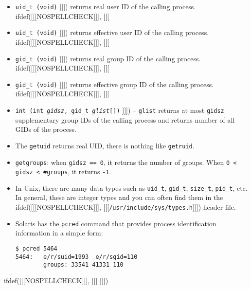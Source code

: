 \begin{slide}
\begin{itemize}
ifdef([[[NOSPELLCHECK]]], [[[
\item \texttt{uid\_t (void)}
]]])
returns real user ID of the calling process.
ifdef([[[NOSPELLCHECK]]], [[[
\item \texttt{uid\_t (void)}
]]])
returns effective user ID of the calling process.
ifdef([[[NOSPELLCHECK]]], [[[
\item \texttt{gid\_t (void)}
]]])
returns real group ID of the calling process.
ifdef([[[NOSPELLCHECK]]], [[[
\item \texttt{gid\_t (void)}
]]])
returns effective group ID of the calling process.
ifdef([[[NOSPELLCHECK]]], [[[
\item \texttt{int (int \emph{gidsz}, gid\_t \emph{glist}[])}
]]])
-- \texttt{glist} returns at most \texttt{gidsz} supplementary group
IDs of the calling process and returns number of all GIDs of the process.
\end{itemize}
\end{slide}

\begin{itemize}
\item The \texttt{getuid} returns real UID, there is nothing like
\texttt{getruid}.
\item \texttt{getgroups}: when \texttt{gidsz~==~0}, it returns the number of
groups. When \texttt{0 < gidsz < \#groups}, it returns \texttt{-1}.
\item In Unix, there are many data types such as \verb#uid_t#, \verb#gid_t#,
\verb#size_t#, \verb#pid_t#, etc.  In general, these are integer types and you
can often find them in the
ifdef([[[NOSPELLCHECK]]], [[[\texttt{/usr/inc{}lude/sys/types.h}]]]) header
file.
\item Solaris has the \texttt{pcred} command that provides process
identification information in a simple form:

\begin{verbatim}
$ pcred 5464
5464:   e/r/suid=1993  e/r/sgid=110
        groups: 33541 41331 110
\end{verbatim}
\end{itemize}


ifdef([[[NOSPELLCHECK]]], [[[
]]])

